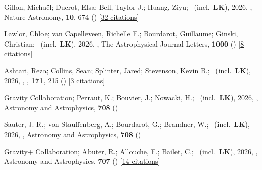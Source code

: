 \item[{\color{numcolor}\scriptsize159}] Gillon, Micha{\"e}l; Ducrot, Elsa; Bell, Taylor J.; Huang, Ziyu; \etal\ (incl.\ \textbf{LK}), 2026, , Nature Astronomy, \textbf{10}, 674 () [\href{https://ui.adsabs.harvard.edu/abs/2026NatAs..10..674G}{32 citations}]

\item[{\color{numcolor}\scriptsize158}] Lawlor, Chloe; van Capelleveen, Richelle F.; Bourdarot, Guillaume; Ginski, Christian; \etal\ (incl.\ \textbf{LK}), 2026, , The Astrophysical Journal Letters, \textbf{1000} () [\href{https://ui.adsabs.harvard.edu/abs/2026ApJ..1000L..38L}{8 citations}]

\item[{\color{numcolor}\scriptsize157}] Ashtari, Reza; Collins, Sean; Splinter, Jared; Stevenson, Kevin B.; \etal\ (incl.\ \textbf{LK}), 2026, , \aj, \textbf{171}, 215 () [\href{https://ui.adsabs.harvard.edu/abs/2026AJ....171..215A}{3 citations}]

\item[{\color{numcolor}\scriptsize156}] Gravity Collaboration; Perraut, K.; Bouvier, J.; Nowacki, H.; \etal\ (incl.\ \textbf{LK}), 2026, , Astronomy and Astrophysics, \textbf{708} ()

\item[{\color{numcolor}\scriptsize155}] Sauter, J. R.; von Stauffenberg, A.; Bourdarot, G.; Brandner, W.; \etal\ (incl.\ \textbf{LK}), 2026, , Astronomy and Astrophysics, \textbf{708} ()

\item[{\color{numcolor}\scriptsize154}] Gravity+ Collaboration; Abuter, R.; Allouche, F.; Bailet, C.; \etal\ (incl.\ \textbf{LK}), 2026, , Astronomy and Astrophysics, \textbf{707} () [\href{https://ui.adsabs.harvard.edu/abs/2026A&A...707A.115G}{14 citations}]

